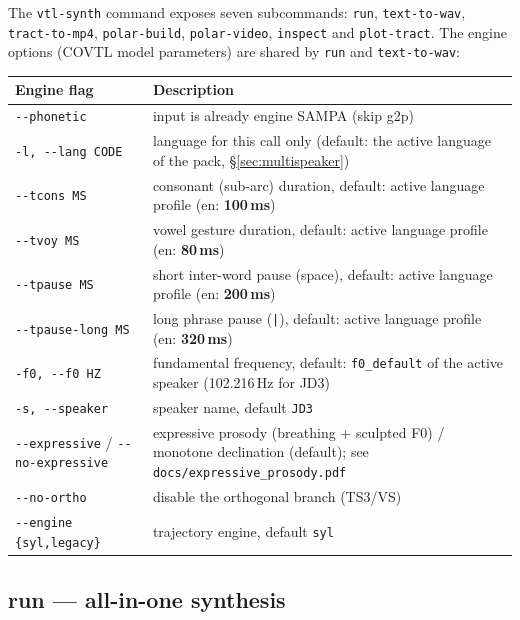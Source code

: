\documentclass[11pt,a4paper]{article}
\begin{document}
The \texttt{vtl-synth} command exposes seven subcommands:
\texttt{run}, \texttt{text-to-wav}, \texttt{tract-to-mp4},
\texttt{polar-build}, \texttt{polar-video}, \texttt{inspect} and
\texttt{plot-tract}. The engine options (COVTL model parameters) are
shared by \texttt{run} and \texttt{text-to-wav}:

\begin{center}
\small
\begin{tabularx}{\textwidth}{lX}
\toprule
\textbf{Engine flag} & \textbf{Description} \\
\midrule
\texttt{-{}-phonetic}        & input is already engine SAMPA (skip g2p) \\
\texttt{-l, -{}-lang CODE}   & language for this call only (default: the active language of the pack, \S\ref{sec:multispeaker}) \\
\texttt{-{}-tcons MS}        & consonant (sub-arc) duration, default: active language profile (en: \textbf{100\,ms}) \\
\texttt{-{}-tvoy MS}         & vowel gesture duration, default: active language profile (en: \textbf{80\,ms}) \\
\texttt{-{}-tpause MS}       & short inter-word pause (space), default: active language profile (en: \textbf{200\,ms}) \\
\texttt{-{}-tpause-long MS}  & long phrase pause (\texttt{|}), default: active language profile (en: \textbf{320\,ms}) \\
\texttt{-f0, -{}-f0 HZ}      & fundamental frequency, default: \texttt{f0\_default} of the active speaker (102.216\,Hz for JD3) \\
\texttt{-s, -{}-speaker}     & speaker name, default \texttt{JD3} \\
\texttt{-{}-expressive} / \texttt{-{}-no-expressive} & expressive prosody (breathing + sculpted F0) / monotone declination (default); see \texttt{docs/expressive\_prosody.pdf} \\
\texttt{-{}-no-ortho}        & disable the orthogonal branch (TS3/VS) \\
\texttt{-{}-engine \{syl,legacy\}} & trajectory engine, default \texttt{syl} \\
\bottomrule
\end{tabularx}
\end{center}

\subsection{run --- all-in-one synthesis}
\end{document}
